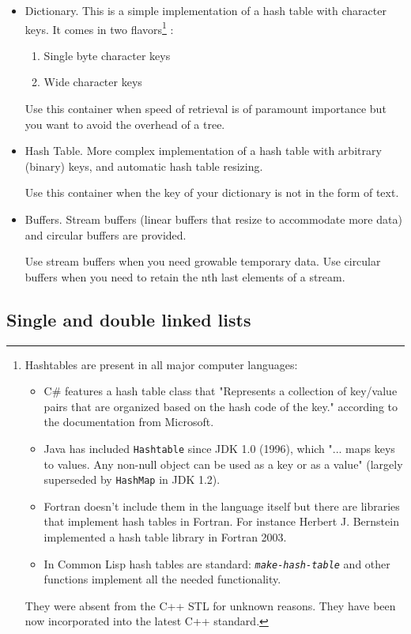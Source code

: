 \documentclass[12pt,a4paper,openany]{memoir} %
\newcommand{\param}[1]{
\texttt{\textsl{#1}}
}
\begin{document}
\begin{itemize}
Use this container when finding a given element is primordial. Insertion, deletions and traversal times are more expensive.
\item
Dictionary. This is a simple implementation of a hash table with character keys. It comes in two flavors\footnote{
Hashtables are present in all major computer languages:
\begin{itemize}
\item C\# features a hash table class that "Represents a collection of key/value pairs that are organized based on the hash code of the key." 
according to the documentation from Microsoft.
\item Java has included \texttt{Hashtable} since JDK 1.0 (1996), which "... maps keys to values. Any non-null object can be used as a key or as a value" (largely superseded by \texttt{HashMap} in JDK 1.2).
\item Fortran doesn't include them in the language itself but there are libraries that implement hash tables in Fortran. For instance 
Herbert J. Bernstein implemented a hash table library in Fortran 2003.
\item In Common Lisp hash tables are standard: \param{make-hash-table} and other functions implement all the needed functionality.
\end{itemize}
They were absent from the C++ STL for unknown reasons. They have been now incorporated into the latest C++ standard.
}
: 
\begin{enumerate}
\item Single byte character keys
\item Wide character keys
\end{enumerate}

Use this container when speed of retrieval is of paramount importance but you want to avoid the overhead of a tree.
\item
Hash Table. More complex implementation of a hash table with arbitrary (binary) keys, and automatic hash table resizing.

Use this container when the key of your dictionary is not in the form of text.
\item Buffers. Stream buffers (linear buffers that resize to accommodate more data) and circular buffers are provided.

Use stream buffers when you need growable temporary data. Use circular buffers when you need to retain the nth last elements of a stream.
\end{itemize}
\subsection{ Single and double linked lists}
\end{document}
